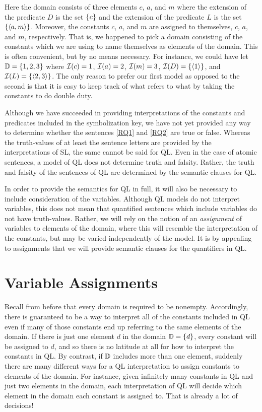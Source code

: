Here the domain consists of three elements $c$, $a$, and $m$ where the extension of the predicate $D$ is the set $\lbrace c\rbrace$ and the extension of the predicate $L$ is the set $\lbrace\langle a,m\rangle\rbrace$.
Moreover, the constants $c$, $a$, and $m$ are assigned to themselves, $c$, $a$, and $m$, respectively. 
That is, we happened to pick a domain consisting of the constants which we are using to name themselves as elements of the domain.
This is often convenient, but by no means necessary.
For instance, we could have let $\mathbb{D}=\lbrace1,2,3\rbrace$ where $\mathcal{I}(c)=1$, $\mathcal{I}(a)=2$, $\mathcal{I}(m)=3$, $\mathcal{I}(D)=\lbrace\langle1\rangle\rbrace$, and $\mathcal{I}(L)=\lbrace\langle2,3\rangle\rbrace$.
The only reason to prefer our first model as opposed to the second is that it is easy to keep track of what refers to what by taking the constants to do double duty.

Although we have succeeded in providing interpretations of the constants and predicates included in the symbolization key, we have not yet provided any way to determine whether the sentences \ref{RQ1} and \ref{RQ2} are true or false.
Whereas the truth-values of at least the sentence letters are provided by the interpretations of SL, the same cannot be said for QL.
Even in the case of atomic sentences, a model of QL does not determine truth and falsity.
Rather, the truth and falsity of the sentences of QL are determined by the semantic clauses for QL.

In order to provide the semantics for QL in full, it will also be necessary to include consideration of the variables.
Although QL models do not interpret variables, this does not mean that quantified sentences which include variables do not have truth-values.
Rather, we will rely on the notion of an \textit{assignment} of variables to elements of the domain, where this will resemble the interpretation of the constants, but may be varied independently of the model.
It is by appealing to assignments that we will provide semantic clauses for the quantifiers in QL.


\section{Variable Assignments}
\label{ch9.VariableAssignments}

Recall from before that every domain is required to be nonempty.
Accordingly, there is guaranteed to be a way to interpret all of the constants included in QL even if many of those constants end up referring to the same elements of the domain.
If there is just one element $d$ in the domain $\mathbb{D}=\lbrace d\rbrace$, every constant will be assigned to $d$, and so there is no latitude at all for how to interpret the constants in QL.
By contrast, if $\mathbb{D}$ includes more than one element, suddenly there are many different ways for a QL interpretation to assign constants to elements of the domain. 
For instance, given infinitely many constants in QL and just two elements in the domain, each interpretation of QL will decide which element in the domain each constant is assigned to.
That is already a lot of decisions!

